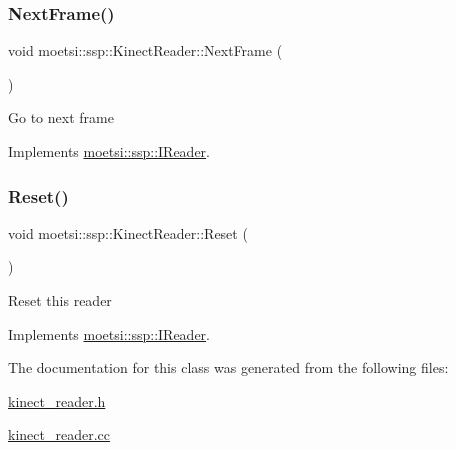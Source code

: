 \subsubsection{\texorpdfstring{Next\+Frame()}{NextFrame()}}
{\footnotesize\ttfamily void moetsi\+::ssp\+::\+Kinect\+Reader\+::\+Next\+Frame (\begin{DoxyParamCaption}{ }\end{DoxyParamCaption})\hspace{0.3cm}{\ttfamily [virtual]}}

Go to next frame 

Implements \hyperlink{classmoetsi_1_1ssp_1_1IReader_a49e82a786cca55248e27e7fac8f97a17}{moetsi\+::ssp\+::\+I\+Reader}.

\mbox{\label{classmoetsi_1_1ssp_1_1KinectReader_a0ad8f7b57ef04554e41a66db797c000e}} 
\subsubsection{\texorpdfstring{Reset()}{Reset()}}
{\footnotesize\ttfamily void moetsi\+::ssp\+::\+Kinect\+Reader\+::\+Reset (\begin{DoxyParamCaption}{ }\end{DoxyParamCaption})\hspace{0.3cm}{\ttfamily [virtual]}}

Reset this reader 

Implements \hyperlink{classmoetsi_1_1ssp_1_1IReader_ad6e2ef78fc2466884aa877ecef54889d}{moetsi\+::ssp\+::\+I\+Reader}.



The documentation for this class was generated from the following files\+:\begin{DoxyCompactItemize}
\item 
\hyperlink{kinect__reader_8h}{kinect\+\_\+reader.\+h}\item 
\hyperlink{kinect__reader_8cc}{kinect\+\_\+reader.\+cc}\end{DoxyCompactItemize}
